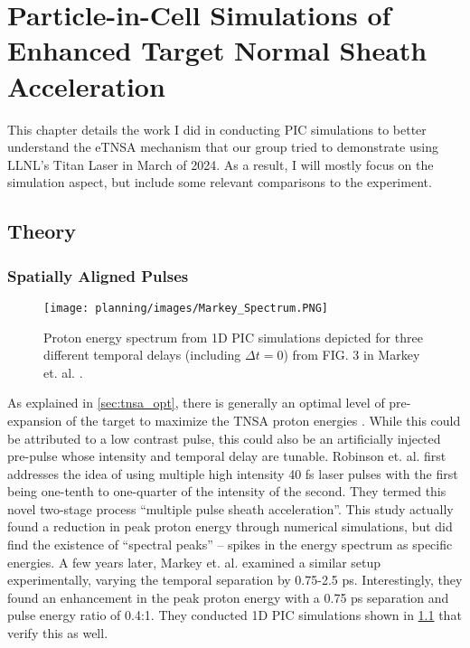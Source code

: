 \chapter{Particle-in-Cell Simulations of Enhanced Target Normal Sheath Acceleration} \label{ch:4}

This chapter details the work I did in conducting \gls{PIC} simulations to better understand the \gls{eTNSA} mechanism that our group tried to demonstrate using \gls{LLNL}'s Titan Laser in March of 2024. As a result, I will mostly focus on the simulation aspect, but include some relevant comparisons to the experiment. 

\section{Theory}

\subsection{Spatially Aligned Pulses} \label{sec:spatialalign}

\begin{figure}
	\centering 
	\texttt{[image: planning/images/Markey\_Spectrum.PNG]}
	\caption{Proton energy spectrum from 1D \gls{PIC} simulations depicted for three different temporal delays (including $\Delta t = 0$) from FIG. 3 in Markey et. al. \cite{Markey_2010_PRL}.}
	\label{fig:markey_spectrum}
\end{figure}

As explained in \cref{sec:tnsa_opt}, there is generally an optimal level of pre-expansion of the target to maximize the \gls{TNSA} proton energies \cite{McKenna_2008_LaPB,Fuchs_2007_PRL}. While this could be attributed to a low contrast pulse, this could also be an artificially injected pre-pulse whose intensity and temporal delay are tunable. Robinson et. al. \cite{Robinson_2007_PPCF} first addresses the idea of using multiple high intensity 40 fs laser pulses with the first being one-tenth to one-quarter of the intensity of the second. They termed this novel two-stage process ``multiple pulse sheath acceleration''. This study actually found a reduction in peak proton energy through numerical simulations, but did find the existence of ``spectral peaks'' -- spikes in the energy spectrum as specific energies. A few years later, Markey et. al. \cite{Markey_2010_PRL} examined a similar setup experimentally, varying the temporal separation by 0.75-2.5 ps. Interestingly, they found an enhancement in the peak proton energy with a 0.75 ps separation and pulse energy ratio of 0.4:1. They conducted 1D PIC simulations shown in \cref{fig:markey_spectrum} that verify this as well.

